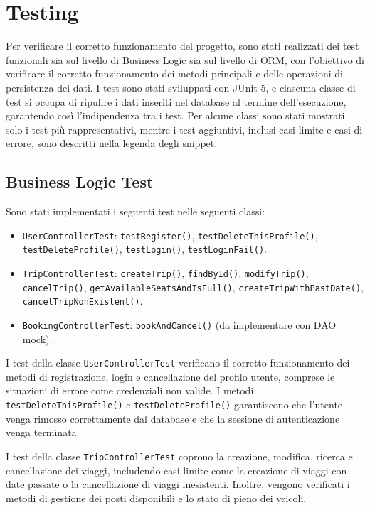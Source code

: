 \section{Testing}

Per verificare il corretto funzionamento del progetto, sono stati realizzati dei test funzionali sia sul livello di Business Logic sia sul livello di ORM, con l'obiettivo di verificare il corretto funzionamento dei metodi principali e delle operazioni di persistenza dei dati.
I test sono stati sviluppati con JUnit 5, e ciascuna classe di test si occupa di ripulire i dati inseriti nel database al termine dell'esecuzione, garantendo così l'indipendenza tra i test.
Per alcune classi sono stati mostrati solo i test più rappresentativi, mentre i test aggiuntivi, inclusi casi limite e casi di errore, sono descritti nella legenda degli snippet.

\subsection{Business Logic Test} \label{subsec:business-logic-test}

Sono stati implementati i seguenti test nelle seguenti classi:
\begin{itemize}
    \item \texttt{UserControllerTest}: \texttt{testRegister()}, \texttt{testDeleteThisProfile()}, \texttt{testDeleteProfile()}, \texttt{testLogin()}, \texttt{testLoginFail()}.
    \item \texttt{TripControllerTest}: \texttt{createTrip()}, \texttt{findById()}, \texttt{modifyTrip()}, \texttt{cancelTrip()}, \texttt{getAvailableSeatsAndIsFull()}, \texttt{createTripWithPastDate()}, \texttt{cancelTripNonExistent()}.
    \item \texttt{BookingControllerTest}: \texttt{bookAndCancel()} (da implementare con DAO mock).
\end{itemize}

\noindent I test della classe \texttt{UserControllerTest} verificano il corretto funzionamento dei metodi di registrazione, login e cancellazione del profilo utente, comprese le situazioni di errore come credenziali non valide. I metodi \texttt{testDeleteThisProfile()} e \texttt{testDeleteProfile()} garantiscono che l'utente venga rimosso correttamente dal database e che la sessione di autenticazione venga terminata.

\noindent I test della classe \texttt{TripControllerTest} coprono la creazione, modifica, ricerca e cancellazione dei viaggi, includendo casi limite come la creazione di viaggi con date passate o la cancellazione di viaggi inesistenti. Inoltre, vengono verificati i metodi di gestione dei posti disponibili e lo stato di pieno dei veicoli.

